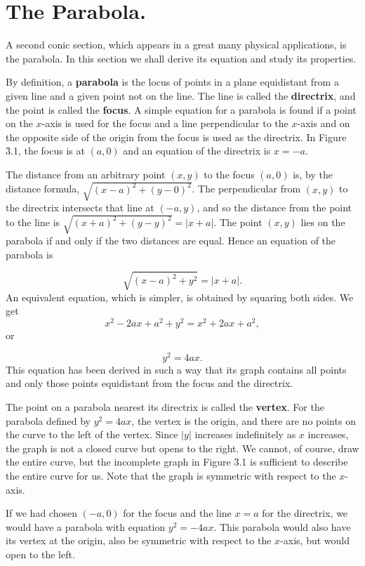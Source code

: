 \section{The Parabola.}\label{sec 3.2} 
A second conic section, which appears in a great many physical applications, is the parabola. In this section we shall derive its equation and study its properties.

By definition, a \textbf{parabola} is the locus of points in a plane equidistant from a given line and a given point not on the line. The line is called the \textbf{directrix}, and the point is called the \textbf{focus}.  A simple equation for a parabola is found if a point on the $x$-axis is used for the focus and a line perpendicular to the $x$-axis and on the opposite side of the origin from the focus is used as the directrix. In Figure \f{3.1}, the focus is at $(a, 0)$ and an equation of the directrix is $x = -a$.

The distance from an arbitrary point $(x, y)$ to the focus $(a, 0)$ is, by the distance formula, $\sqrt{(x-a)^2 + (y-0)^2}$. The perpendicular from $(x, y)$ to the directrix intersects that line at $(-a, y)$, and so the distance from the point to the line is $\sqrt{(x + a)^2 + (y - y)^2} = | x + a |$. The point $(x, y)$
lies on the parabola if and only if the two distances are equal. Hence an
equation of the parabola is

$$
\sqrt{(x-a)^2 + y^2} = |x + a|.
$$
\noindent An equivalent equation, which is simpler, is obtained by squaring both sides. We get
$$
x^2-2ax + a^2 + y^2 = x^2 + 2ax + a^2, 
$$
\noindent or

$$
y^2 = 4ax.  
$$
\noindent This equation has been derived in such a way that its graph contains all points and only those points equidistant from the focus and the directrix.


The point on a parabola nearest its directrix is called the \textbf{vertex}.  For the parabola defined by $y^2 = 4ax$, the vertex is the origin, and there are no points on the curve to the left of the vertex. Since $|y|$ increases indefinitely as $x$ increases, the graph is not a closed curve but opens to the right. We cannot, of course, draw the entire curve, but the incomplete graph in Figure \f{3.1} is sufficient to describe the entire curve for us. Note that the graph is symmetric with respect to the $x$-axis.

If we had chosen $(-a, 0)$ for the focus and the line $x = a$ for the directrix, we would have a parabola with equation $y^2 = -4ax$. This parabola would also have its vertex at the origin, also be symmetric with respect to the $x$-axis, but would open to the left.


